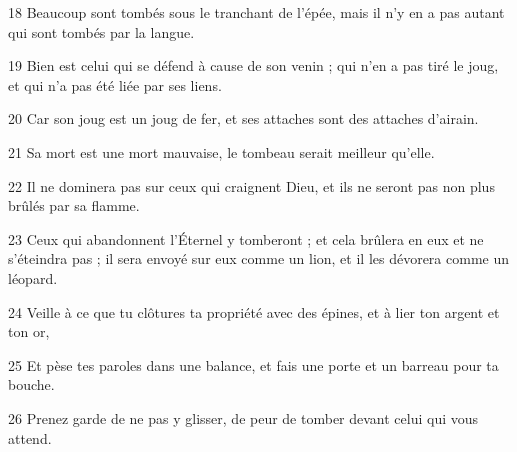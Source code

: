 \par 18 Beaucoup sont tombés sous le tranchant de l'épée, mais il n'y en a pas autant qui sont tombés par la langue.
\par 19 Bien est celui qui se défend à cause de son venin ; qui n'en a pas tiré le joug, et qui n'a pas été liée par ses liens.
\par 20 Car son joug est un joug de fer, et ses attaches sont des attaches d'airain.
\par 21 Sa mort est une mort mauvaise, le tombeau serait meilleur qu'elle.
\par 22 Il ne dominera pas sur ceux qui craignent Dieu, et ils ne seront pas non plus brûlés par sa flamme.
\par 23 Ceux qui abandonnent l'Éternel y tomberont ; et cela brûlera en eux et ne s'éteindra pas ; il sera envoyé sur eux comme un lion, et il les dévorera comme un léopard.
\par 24 Veille à ce que tu clôtures ta propriété avec des épines, et à lier ton argent et ton or,
\par 25 Et pèse tes paroles dans une balance, et fais une porte et un barreau pour ta bouche.
\par 26 Prenez garde de ne pas y glisser, de peur de tomber devant celui qui vous attend.


